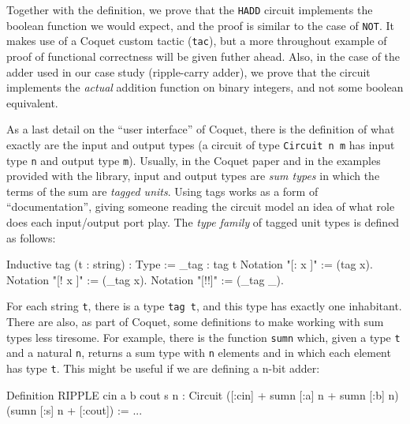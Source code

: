             Together with the definition, we prove that the \texttt{HADD} circuit implements the
            boolean function we would expect, and the proof is similar to the case of \texttt{NOT}.
            It makes use of a Coquet custom tactic (\texttt{tac}), but a more throughout example of
            proof of functional correctness will be given futher ahead.  Also, in the case of the
            adder used in our case study (ripple-carry adder), we prove that the circuit implements
            the \emph{actual} addition function on binary integers, and not some boolean equivalent.

            As a last detail on the ``user interface'' of Coquet, there is the definition of what
            exactly are the input and output types (a circuit of type \texttt{Circuit n m} has input
            type \texttt{n} and output type \texttt{m}). Usually, in the Coquet
            paper\cite{coquet2011} and in the examples provided with the library, input and output
            types are \emph{sum types} in which the terms of the sum are \emph{tagged units}. Using
            tags works as a form of ``documentation'', giving someone reading the circuit model an
            idea of what role does each input/output port play. The \emph{type family} of tagged
            unit types is defined as follows:

            \begin{coqcode}
        Inductive tag (t : string) : Type := _tag : tag t
        Notation "[: x ]" := (tag x).
        Notation "[! x ]" := (_tag x).
        Notation "[!!]"   := (_tag _).
            \end{coqcode}

            For each string \texttt{t}, there is a type \texttt{tag t}, and this type has exactly
            one inhabitant. There are also, as part of Coquet, some definitions to make working with
            sum types less tiresome. For example, there is the function \texttt{sumn} which, given a
            type \texttt{t} and a natural \texttt{n}, returns a sum type with \texttt{n} elements
            and in which each element has type \texttt{t}.  This might be useful if we are defining
            a n-bit adder:

            \begin{coqcode}
        Definition RIPPLE cin a b cout s n :
            Circuit  ([:cin] + sumn [:a] n + sumn [:b] n)  (sumn [:s] n + [:cout]) := ...
            \end{coqcode}

